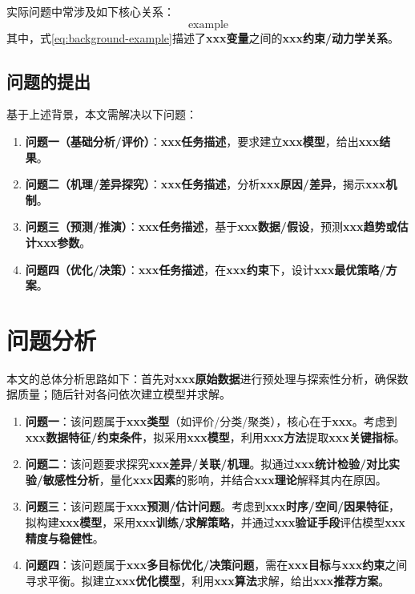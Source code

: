 \documentclass[draft,12pt,a4paper]{ctexart}
\theoremstyle{definition}
\begin{document}
实际问题中常涉及如下核心关系：
\begin{equation}
  \text{example}
  \label{eq:background-example}
\end{equation}
其中，式\eqref{eq:background-example}描述了\textbf{xxx变量}之间的\textbf{xxx约束/动力学关系}。

\subsection{问题的提出}
基于上述背景，本文需解决以下问题：
\begin{enumerate}[label=\arabic*.]
  \item \textbf{问题一（基础分析/评价）}：\textbf{xxx任务描述}，要求建立\textbf{xxx模型}，给出\textbf{xxx结果}。
  \item \textbf{问题二（机理/差异探究）}：\textbf{xxx任务描述}，分析\textbf{xxx原因/差异}，揭示\textbf{xxx机制}。
  \item \textbf{问题三（预测/推演）}：\textbf{xxx任务描述}，基于\textbf{xxx数据/假设}，预测\textbf{xxx趋势或估计xxx参数}。
  \item \textbf{问题四（优化/决策）}：\textbf{xxx任务描述}，在\textbf{xxx约束}下，设计\textbf{xxx最优策略/方案}。
\end{enumerate}

\newpage
\section{问题分析}

本文的总体分析思路如下：首先对\textbf{xxx原始数据}进行预处理与探索性分析，确保数据质量；随后针对各问依次建立模型并求解。

\begin{enumerate}[label=\arabic*.]
  \item \textbf{问题一}：该问题属于\textbf{xxx类型}（如评价/分类/聚类），核心在于\textbf{xxx}。考虑到\textbf{xxx数据特征/约束条件}，拟采用\textbf{xxx模型}，利用\textbf{xxx方法}提取\textbf{xxx关键指标}。
  \item \textbf{问题二}：该问题要求探究\textbf{xxx差异/关联/机理}。拟通过\textbf{xxx统计检验/对比实验/敏感性分析}，量化\textbf{xxx因素}的影响，并结合\textbf{xxx理论}解释其内在原因。
  \item \textbf{问题三}：该问题属于\textbf{xxx预测/估计问题}。考虑到\textbf{xxx时序/空间/因果特征}，拟构建\textbf{xxx模型}，采用\textbf{xxx训练/求解策略}，并通过\textbf{xxx验证手段}评估模型\textbf{xxx精度与稳健性}。
  \item \textbf{问题四}：该问题属于\textbf{xxx多目标优化/决策问题}，需在\textbf{xxx目标}与\textbf{xxx约束}之间寻求平衡。拟建立\textbf{xxx优化模型}，利用\textbf{xxx算法}求解，给出\textbf{xxx推荐方案}。
\end{enumerate}
\end{document}

